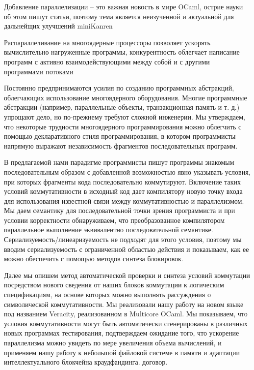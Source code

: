 

Добавление параллелизации -- это важная новость в мире OCaml, острие науки об этом пишут статьи,
поэтому тема является неизученной и актуальной для дальнейщих улучшений miniKanren

Распараллеливание на многоядерные процессоры позволяет ускорять вычислительно нагруженные программы, конкурентность облегчает написание программ с активно взаимодействующими между собой и с другими программами потоками

Постоянно предпринимаются усилия по созданию программных абстракций, облегчающих использование многоядерного оборудования. Многие программные абстракции (например, параллельные объекты, транзакционная память и т. д.) упрощают дело, но по-прежнему требуют сложной инженерии. Мы утверждаем, что некоторые трудности многоядерного программирования можно облегчить с помощью декларативного стиля программирования, в котором программисты напрямую выражают независимость фрагментов последовательных программ.

В предлагаемой нами парадигме программисты пишут программы знакомым последовательным образом с добавленной возможностью явно указывать условия, при которых фрагменты кода последовательно коммутируют. Включение таких условий коммутативности в исходный код дает компилятору новую точку входа для использования известной связи между коммутативностью и параллелизмом. Мы даем семантику для последовательной точки зрения программиста и при условии корректности обнаруживаем, что преобразованное компилятором параллельное выполнение эквивалентно последовательной семантике. Сериализуемость/линеаризуемость не подходят для этого условия, поэтому мы вводим сериализуемость с ограниченной областью действия и показываем, как ее можно обеспечить с помощью методов синтеза блокировок.

Далее мы опишем метод автоматической проверки и синтеза условий коммутации посредством нового сведения от наших блоков коммутации к логическим спецификациям, на основе которых можно выполнять рассуждения о символической коммутативности. Мы реализовали нашу работу на новом языке под названием Veracity, реализованном в Multicore OCaml. Мы показываем, что условия коммутативности могут быть автоматически сгенерированы в различных новых программах тестирования, подтверждаем ожидание того, что ускорение параллелизма можно увидеть по мере увеличения объема вычислений, и применяем нашу работу к небольшой файловой системе в памяти и адаптации интеллектуального блокчейна краудфандинга. договор.


